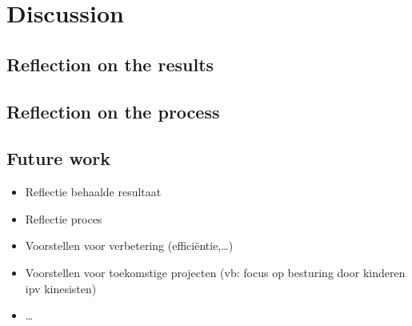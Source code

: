 \chapter{Discussion}

\section{Reflection on the results}

\section{Reflection on the process}

\section{Future work}

\begin{itemize}
\item Reflectie behaalde resultaat
\item Reflectie proces
\item Voorstellen voor verbetering (effici\"entie,\ldots)
\item Voorstellen voor toekomstige projecten (vb: focus op besturing door kinderen ipv kinesisten)
\item \ldots
\end{itemize}